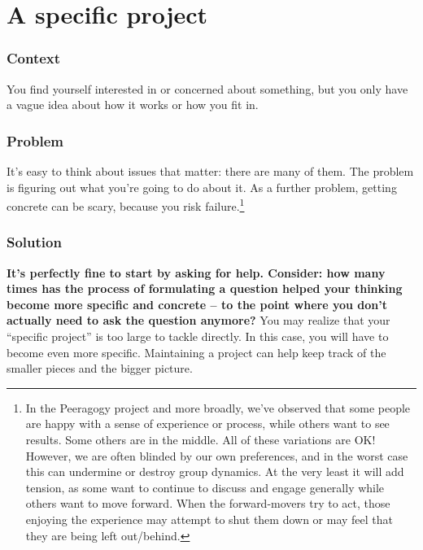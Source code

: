 \begingroup \color{BurntOrange}

\section{A specific project}\label{sec:A_specific_project}
\subsubsection*{Context}
You find yourself interested in or concerned about something, but you
only have a vague idea about how it works or how you fit in.

\subsubsection*{Problem}
It's easy to think about issues that matter: there are many of
them. The problem is figuring out what you're going to do about it.
As a further problem, getting concrete can be scary, because you risk
failure.\footnote{In the Peeragogy project and more broadly, we've
  observed that some people are happy with a sense of experience or
  process, while others want to see results. Some others are in the
  middle.  All of these variations are OK!  However, we are often
  blinded by our own preferences, and in the worst case this can
  undermine or destroy group dynamics.  At the very least it will add
  tension, as some want to continue to discuss and engage generally
  while others want to move forward.  When the forward-movers try to
  act, those enjoying the experience may attempt to shut them down or
  may feel that they are being left out/behind.}

\subsubsection*{Solution} 
\textbf{It's perfectly fine to start by asking for help.  Consider: how many times has the process of formulating a question helped your thinking become more specific and concrete -- to the point where you don't actually need to ask the question anymore?}  You may realize that your ``specific project'' is too large to tackle directly. In this case, you will have to become even more specific.  Maintaining a project  can help keep track of the smaller pieces and the bigger picture.  

